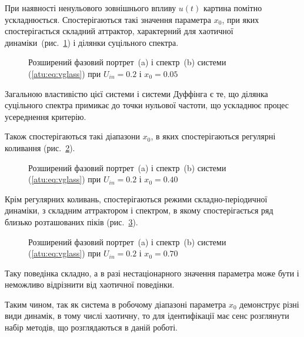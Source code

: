 При наявності ненульового зовнішнього впливу
$u(t)$ картина помітно ускладнюється. Спостерігаються такі
значення параметра
$x_0$, при яких спостерігається складний аттрактор, характерний
для хаотичної динаміки~(рис.~\ref{atu:f:vglass_phase_f_u10}) і ділянки
суцільного спектра.

\begin{figure}[htb!]
  \caption{Розширений фазовий портрет~(a) і спектр~(b) системи (\ref{atu:eq:vglass}) при $ U_{in} = 0.2 $ і $ x_0 = 0.05 $}
\label{atu:f:vglass_phase_f_u10}
\end{figure}

Загальною властивістю цієї системи і системи Дуффінга є те, що
ділянка суцільного спектра примикає до точки нульової частоти,
що ускладнює процес усереднення критерію.

Також спостерігаються такі діапазони
$ x_0 $, в яких спостерігаються регулярні коливання
(рис.~\ref{atu:f:vglass_phase_f_u11}).

\begin{figure}[htb!]
  \caption{Розширений фазовий портрет~(a) і спектр~(b) системи (\ref{atu:eq:vglass}) при $ U_{in} = 0.2 $ і $ x_0 = 0.40 $}
\label{atu:f:vglass_phase_f_u11}
\end{figure}

Крім регулярних коливань, спостерігаються режими
складно-періодичної динаміки, з складним аттрактором і
спектром, в якому спостерігається ряд близько розташованих
піків (рис.~\ref{atu:f:vglass_phase_f_u12}).

\begin{figure}[htb!]
  \caption{Розширений фазовий портрет~(a) і спектр~(b) системи (\ref{atu:eq:vglass}) при $ U_{in} = 0.2 $ і $ x_0 = 0.70 $}
\label{atu:f:vglass_phase_f_u12}
\end{figure}

Таку поведінка складно, а в разі нестаціонарного значення
параметра може бути і неможливо відрізнити від хаотичної
поведінки.

Таким чином, так як система в робочому діапазоні параметра
$x_0$ демонструє різні види динамік, в тому числі хаотичну,
то для ідентифікації має сенс розглянути набір методів, що
розглядаються в даній роботі.


